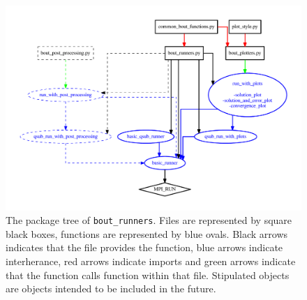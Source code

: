 \documentclass[12pt]{article}
\begin{document}
\begin{figure}[htbp!]
\centering
\includegraphics[width=0.8\paperwidth]{figs/program_tree.pdf}
\caption{The package tree of \lstinline!bout_runners!. Files are represented by 
square black boxes, functions are represented by blue ovals. Black arrows 
indicates that the file provides the function, blue arrows indicate 
interherance, red arrows indicate imports and green arrows indicate that the 
function calls function within that file. Stipulated objects are objects 
intended to be included in the future.}
\label{fig:program_tree}
\end{figure}

\printindex
\end{document}
